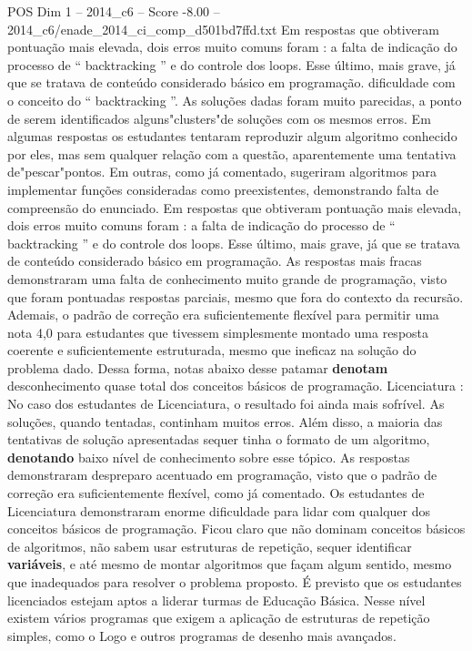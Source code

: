 \begin{textsample}{POS Dim 1 – 2014\_c6 – Score -8.00 – 2014\_c6/enade\_2014\_ci\_comp\_d501bd7ffd.txt}
Em respostas que obtiveram pontuação mais elevada, dois erros muito comuns foram : a falta de indicação do processo de “ backtracking ” e do controle dos loops.
Esse último, mais grave, já que se tratava de conteúdo considerado básico em programação. dificuldade com o conceito do “ backtracking ”.
As soluções dadas foram muito parecidas, a ponto de serem identificados alguns"clusters"de soluções com os mesmos erros.
Em algumas respostas os estudantes tentaram reproduzir algum algoritmo conhecido por eles, mas sem qualquer relação com a questão, aparentemente uma tentativa de"pescar"pontos.
Em outras, como já comentado, sugeriram algoritmos para implementar funções consideradas como preexistentes, demonstrando falta de compreensão do enunciado.
Em respostas que obtiveram pontuação mais elevada, dois erros muito comuns foram : a falta de indicação do processo de “ backtracking ” e do controle dos loops.
Esse último, mais grave, já que se tratava de conteúdo considerado básico em programação.
As respostas mais fracas demonstraram uma falta de conhecimento muito grande de programação, visto que foram pontuadas respostas parciais, mesmo que fora do contexto da recursão.
Ademais, o padrão de correção era suficientemente flexível para permitir uma nota 4,0 para estudantes que tivessem simplesmente montado uma resposta coerente e suficientemente estruturada, mesmo que ineficaz na solução do problema dado.
Dessa forma, notas abaixo desse patamar \textbf{denotam} desconhecimento quase total dos conceitos básicos de programação.
Licenciatura : No caso dos estudantes de Licenciatura, o resultado foi ainda mais sofrível.
As soluções, quando tentadas, continham muitos erros.
Além disso, a maioria das tentativas de solução apresentadas sequer tinha o formato de um algoritmo, \textbf{denotando} baixo nível de conhecimento sobre esse tópico.
As respostas demonstraram despreparo acentuado em programação, visto que o padrão de correção era suficientemente flexível, como já comentado.
Os estudantes de Licenciatura demonstraram enorme dificuldade para lidar com qualquer dos conceitos básicos de programação.
Ficou claro que não dominam conceitos básicos de algoritmos, não sabem usar estruturas de repetição, sequer identificar \textbf{variáveis}, e até mesmo de montar algoritmos que façam algum sentido, mesmo que inadequados para resolver o problema proposto.
É previsto que os estudantes licenciados estejam aptos a liderar turmas de Educação Básica.
Nesse nível existem vários programas que exigem a aplicação de estruturas de repetição simples, como o Logo e outros programas de desenho mais avançados.

\end{textsample}

